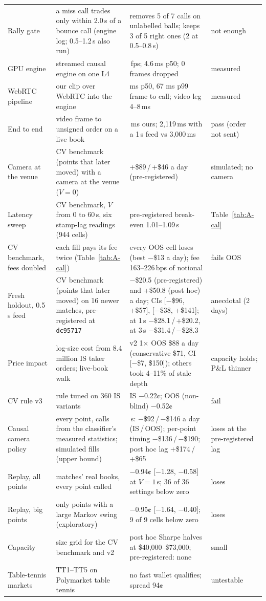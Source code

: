 \documentclass[11pt,letterpaper]{article}
\begin{document}
{\begin{longtable}{@{}>{\raggedright\arraybackslash}p{1.12in}>{\raggedright\arraybackslash}p{1.72in}>{\raggedright\arraybackslash}p{2.4in}>{\raggedright\arraybackslash}p{0.92in}@{}}
Rally gate & a miss call trades only within 2.0\,s of a bounce call (engine log; 0.5–1.2\,s also run) & removes 5 of 7 calls on unlabelled balls; keeps 3 of 5 right ones (2 at 0.5–0.8\,s) & not enough \\
GPU engine & streamed causal engine on one L4 & 119.9\,fps; 4.6\,ms p50; 0 frames dropped & measured \\
WebRTC pipeline & our clip over WebRTC into the engine & 46 ms p50, 67 ms p99 frame to call; video leg 4–8\,ms & measured \\
End to end & video frame to unsigned order on a live book & 54\,ms ours; 2,119\,ms with a 1\,s feed vs 3,000\,ms & pass (order not sent) \\
Camera at the venue & CV benchmark (points that later moved) with a camera at the venue ($V = 0$) & +\$89\,/\,+\$46 a day (pre-registered) & simulated; no camera \\
Latency sweep & CV benchmark, $V$ from 0 to 60\,s, six stamp-lag readings (944 cells) & pre-registered break-even 1.01--1.09\,s & Table~\ref{tab:A-cal} \\
CV benchmark, fees doubled & each fill pays its fee twice (Table~\ref{tab:A-cal}) & every OOS cell loses (best −\$13 a day); fee 163–226\,bps of notional & fails OOS \\
Fresh holdout, 0.5\,s feed & CV benchmark (points that later moved) on 16 newer matches, pre-registered at \texttt{dc95717} & −\$20.5 (pre-registered) and +\$50.8 (post hoc) a day; CIs [−\$96, +\$57], [−\$38, +\$141]; at 1\,s −\$28.1\,/\,+\$20.2, at 3\,s −\$31.4\,/\,−\$28.3 & anecdotal (2 days) \\
Price impact & log-size cost from 8.4 million IS taker orders; live-book walk & v2 1$\times$ OOS \$88 a day (conservative \$71, CI [−\$7, \$150]); others took 4–11\% of stale depth & capacity holds; P\&L thinner \\
CV rule v3 & rule tuned on 360 IS variants & IS −0.22¢; OOS (non-blind) −0.52¢ & fail \\
Causal camera policy & every point, calls from the classifier's measured statistics; simulated fills (upper bound) & 0.5\,s: −\$92\,/\,−\$146 a day (IS\,/\,OOS); per-point timing −\$136\,/\,−\$190; post hoc lag +\$174\,/\,+\$65 & loses at the pre-registered lag \\
Replay, all points & 9 matches' real books, every point called & −0.94¢ [−1.28, −0.58] at $V = 1$\,s; 36 of 36 settings below zero & loses \\
Replay, big points & only points with a large Markov swing (exploratory) & −0.95¢ [−1.64, −0.40]; 9 of 9 cells below zero & loses \\
Capacity & size grid for the CV benchmark and v2 & post hoc Sharpe halves at \$40,000--\$73,000; pre-registered: none & small \\
Table-tennis markets & TT1--TT5 on Polymarket table tennis & no fast wallet qualifies; spread 94¢ & untestable \\
\end{longtable}}
\end{document}

